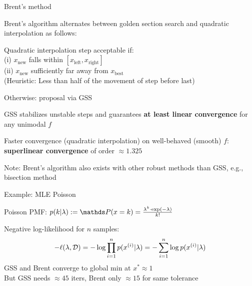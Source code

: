 \documentclass[11pt,compress,t,notes=noshow, xcolor=table]{beamer}
\newcommand{\xleft}{x_{\text{left}}}
\newcommand{\xright}{x_{\text{right}}}
\newcommand{\xnew}{x_{\text{new}}}
\newcommand{\xbest}{x_{\text{best}}}
\newcommand{\xii}{x^{(i)}}
\begin{document}
\begin{framei}{Brent's method}
\item Brent's algorithm  alternates between golden section search and quadratic interpolation as follows:
\begin{itemizeM}
\item Quadratic interpolation step acceptable if:\\
(i) $\xnew$ falls within $[\xleft, \xright]$\\
(ii) $\xnew$ sufficiently far away from  $\xbest$ \\
{\footnotesize (Heuristic: Less than half of the movement of step before last)}
\item Otherwise: proposal via GSS
\end{itemizeM}
\item GSS stabilizes unstable steps and guarantees \textbf{at least linear convergence} for any unimodal $f$
\item Faster convergence (quadratic interpolation) on well-behaved (smooth) $f$: \textbf{superlinear convergence} of order $\approx 1.325$
\item Note: Brent's algorithm also exists with other robust methods than GSS, e.g., bisection method
\end{framei}


\begin{framei}{Example: MLE Poisson}
\item Poisson PMF: $p(k|\lambda) := \P(x = k) = \frac{\lambda^k \cdot \exp(-\lambda)}{k!}$
\item Negative log-likelihood for $n$ samples:
\begin{equation*}
- \ell(\lambda, \mathcal{D}) = - \log \prodin  p(\xii | \lambda) =  - \sumin \log p(\xii | \lambda)
\end{equation*}
GSS and Brent converge to global min at $x^\ast \approx 1$ \\
But GSS needs $\approx 45$ iters, Brent only $\approx 15$ for same tolerance
\end{framei}

\endlecture
\end{document}
